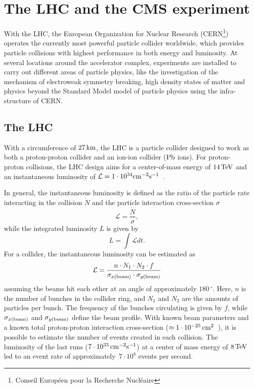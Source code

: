 \acresetall
\chapter[The LHC and the CMS experiment]{The \acl{LHC} and the \acl{CMS} experiment}\label{cha:LHC_CMS}

With the \ac{LHC}, the European Organization for Nuclear Research (CERN\footnote{Conseil Europ\'{e}en pour la Recherche Nucl\'{e}aire}) operates the currently most powerful particle collider worldwide, which provides particle collisions with highest performance in both energy and luminosity. At several locations around the accelerator complex, experiments are installed to carry out different areas of particle physics, like the investigation of the mechanism of electroweak symmetry breaking, high density states of matter and physics beyond the Standard Model model of particle physics using the infra-structure of CERN.

\section{The \acl{LHC}}\label{sec:LHC}
With a circumference of $27\,\rm{km}$, the \ac{LHC} is a particle collider designed to work as both a proton-proton collider and an ion-ion collider ($\rm{Pb}$ ions). For proton-proton collisions, the \ac{LHC} design aims for a center-of-mass energy of $14\,\rm{TeV}$ and an instantaneous luminosity of $\mathcal{L}=1\cdot 10^{34}\rm{cm^{-2}s^{-1}}$~\cite{LHC14}.

In general, the instantaneous luminosity is defined as the ratio of the particle rate interacting in the collision $\dot N$ and the particle interaction cross-section $\sigma$
\begin{equation}
\mathcal{L}=\frac{\dot N}{\sigma},
\end{equation}
while the integrated luminosity $L$ is given by
\begin{equation}
L=\int \mathcal{L} dt.
\end{equation}
For a collider, the instantaneous luminosity can be estimated as
\begin{equation}
\mathcal{L}=\frac{n \cdot N_1 \cdot N_2 \cdot f}{\sigma _{x(\rm{beam})}\cdot \sigma _{y(\rm{beam})}}
\end{equation}
assuming the beams hit each other at an angle of approximately $180\,^{\circ}$. Here, $n$ is the number of bunches in the collider ring, and $N_1$ and $N_2$ are the amounts of particles per bunch. The frequency of the bunches circulating is given by $f$, while $\sigma _{x\rm{(beam)}}$ and $\sigma _{y\rm{(beam)}}$ define the beam profile. With known beam parameters and a known total proton-proton interaction cross-section ($\approx 1\cdot 10^{-25}\,\rm{cm^2}$~\cite{Ant12}), it is possible to estimate the number of events created in each collision. The luminosity of the last runs ($7\cdot 10^{33}\,\rm{cm^{-2}s^{-1}}$) at a center of mass energy of $8\,\rm{TeV}$ led to an event rate of approximately~$7\cdot 10^8$ events per second.

